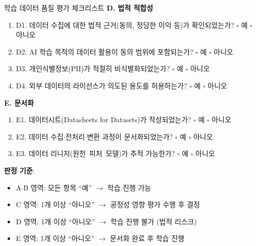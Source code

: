 \begin{practicaltool}{학습 데이터 품질 평가 체크리스트}
\textbf{D. 법적 적합성}
\begin{enumerate}
 \item D1. 데이터 수집에 대한 법적 근거(동의, 정당한 이익 등)가 확인되었는가? \hfill $\square$ 예 $\square$ 아니오
 \item D2. AI 학습 목적의 데이터 활용이 동의 범위에 포함되는가? \hfill $\square$ 예 $\square$ 아니오
 \item D3. 개인식별정보(PII)가 적절히 비식별화되었는가? \hfill $\square$ 예 $\square$ 아니오
 \item D4. 외부 데이터의 라이선스가 의도된 용도를 허용하는가? \hfill $\square$ 예 $\square$ 아니오
\end{enumerate}

\textbf{E. 문서화}
\begin{enumerate}
 \item E1. 데이터시트(Datasheets for Datasets)가 작성되었는가? \hfill $\square$ 예 $\square$ 아니오
 \item E2. 데이터 수집$\cdot$전처리$\cdot$변환 과정이 문서화되었는가? \hfill $\square$ 예 $\square$ 아니오
 \item E3. 데이터 리니지(원천~피처~모델)가 추적 가능한가? \hfill $\square$ 예 $\square$ 아니오
\end{enumerate}

\textbf{판정 기준}:
\begin{itemize}
 \item A$\cdot$B 영역: 모든 항목 ``예'' $\rightarrow$ 학습 진행 가능
 \item C 영역: 1개 이상 ``아니오'' $\rightarrow$ 공정성 영향 평가 수행 후 결정
 \item D 영역: 1개 이상 ``아니오'' $\rightarrow$ 학습 진행 불가 (법적 리스크)
 \item E 영역: 1개 이상 ``아니오'' $\rightarrow$ 문서화 완료 후 학습 진행
\end{itemize}
\end{practicaltool}


